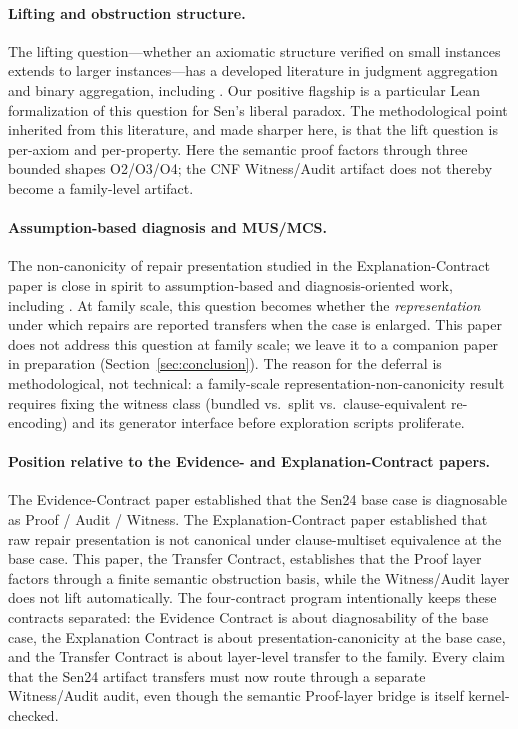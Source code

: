\paragraph{Lifting and obstruction structure.}
The lifting question---whether an axiomatic structure verified on small instances extends to larger instances---has a developed literature in judgment aggregation and binary aggregation, including \citet{grandiendriss2013}.
Our positive flagship is a particular Lean formalization of this question for Sen's liberal paradox.
The methodological point inherited from this literature, and made sharper here, is that the lift question is per-axiom and per-property.
Here the semantic proof factors through three bounded shapes O2/O3/O4; the CNF Witness/Audit artifact does not thereby become a family-level artifact.

\paragraph{Assumption-based diagnosis and MUS/MCS.}
The non-canonicity of repair presentation studied in the Explanation-Contract paper is close in spirit to assumption-based and diagnosis-oriented work, including \citet{dekleer1986atms}.
At family scale, this question becomes whether the \emph{representation} under which repairs are reported transfers when the case is enlarged.
This paper does not address this question at family scale; we leave it to a companion paper in preparation (Section~\ref{sec:conclusion}).
The reason for the deferral is methodological, not technical: a family-scale representation-non-canonicity result requires fixing the witness class (bundled vs.\ split vs.\ clause-equivalent re-encoding) and its generator interface before exploration scripts proliferate.

\paragraph{Position relative to the Evidence- and Explanation-Contract papers.}
The Evidence-Contract paper established that the Sen24 base case is diagnosable as Proof / Audit / Witness.
The Explanation-Contract paper established that raw repair presentation is not canonical under clause-multiset equivalence at the base case.
This paper, the Transfer Contract, establishes that the Proof layer factors through a finite semantic obstruction basis, while the Witness/Audit layer does not lift automatically.
The four-contract program intentionally keeps these contracts separated: the Evidence Contract is about diagnosability of the base case, the Explanation Contract is about presentation-canonicity at the base case, and the Transfer Contract is about layer-level transfer to the family.
Every claim that the Sen24 artifact transfers must now route through a separate Witness/Audit audit, even though the semantic Proof-layer bridge is itself kernel-checked.

